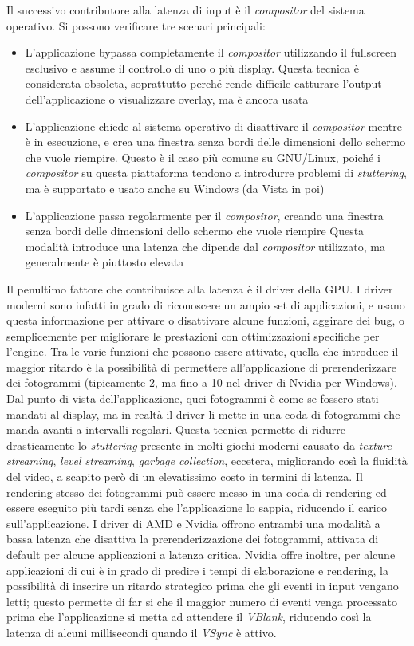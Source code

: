 Il successivo contributore alla latenza di input è il \textit{compositor} del sistema operativo. Si possono verificare tre scenari principali:
\begin{itemize}
	\item L'applicazione bypassa completamente il \textit{compositor} utilizzando il fullscreen esclusivo e assume il controllo di uno o più display. Questa tecnica è considerata obsoleta, soprattutto perché rende difficile catturare l'output dell'applicazione o visualizzare overlay, ma è ancora usata
	\item L'applicazione chiede al sistema operativo di disattivare il \textit{compositor} mentre è in esecuzione, e crea una finestra senza bordi delle dimensioni dello schermo che vuole riempire. Questo è il caso più comune su GNU/Linux, poiché i \textit{compositor} su questa piattaforma tendono a introdurre problemi di \textit{stuttering}, ma è supportato e usato anche su Windows (da Vista in poi)
	\item L'applicazione passa regolarmente per il \textit{compositor}, creando una finestra senza bordi delle dimensioni dello schermo che vuole riempire Questa modalità introduce una latenza che dipende dal \textit{compositor} utilizzato, ma generalmente è piuttosto elevata
\end{itemize}

Il penultimo fattore che contribuisce alla latenza è il driver della GPU. I driver moderni sono infatti in grado di riconoscere un ampio set di applicazioni, e usano questa informazione per attivare o disattivare alcune funzioni, aggirare dei bug, o semplicemente per migliorare le prestazioni con ottimizzazioni specifiche per l'engine. Tra le varie funzioni che possono essere attivate, quella che introduce il maggior ritardo è la possibilità di permettere all'applicazione di prerenderizzare dei fotogrammi (tipicamente 2, ma fino a 10 nel driver di Nvidia per Windows). Dal punto di vista dell'applicazione, quei fotogrammi è come se fossero stati mandati al display, ma in realtà il driver li mette in una coda di fotogrammi che manda avanti a intervalli regolari. Questa tecnica permette di ridurre drasticamente lo \textit{stuttering} presente in molti giochi moderni causato da \textit{texture streaming}, \textit{level streaming}, \textit{garbage collection}, eccetera, migliorando così la fluidità del video, a scapito però di un elevatissimo costo in termini di latenza. Il rendering stesso dei fotogrammi può essere messo in una coda di rendering ed essere eseguito più tardi senza che l'applicazione lo sappia, riducendo il carico sull'applicazione. I driver di AMD e Nvidia offrono entrambi una modalità a bassa latenza che disattiva la prerenderizzazione dei fotogrammi, attivata di default per alcune applicazioni a latenza critica. Nvidia offre inoltre, per alcune applicazioni di cui è in grado di predire i tempi di elaborazione e rendering, la possibilità di inserire un ritardo strategico prima che gli eventi in input vengano letti; questo permette di far si che il maggior numero di eventi venga processato prima che l'applicazione si metta ad attendere il \textit{VBlank}, riducendo così la latenza di alcuni millisecondi quando il \textit{VSync} è attivo.

